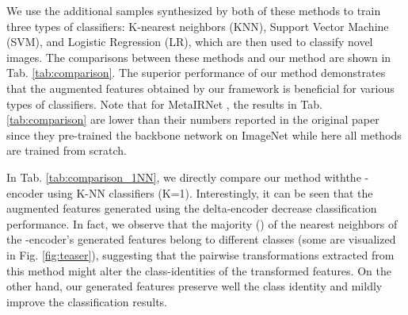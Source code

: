 \documentclass[10pt,twocolumn,letterpaper]{article}
\begin{document}
  
We use the additional samples synthesized by both of these methods to train three types of classifiers:
  K-nearest neighbors (KNN), Support Vector Machine (SVM), and Logistic Regression (LR), which are then used to classify novel images. The comparisons between these methods and our method are shown in Tab. \ref{tab:comparison}.
The superior performance of our method demonstrates that the augmented features obtained by our framework is beneficial for various types of classifiers.
Note that for MetaIRNet \cite{metair_gan}, the results in Tab. \ref{tab:comparison} are lower than their numbers reported in the original paper since they pre-trained the backbone network on ImageNet while here all methods are trained from scratch. 
   \begin{table}[!h] 
    \centering

    \caption{\textbf{Analysis of different classifiers.} Few-shot classification accuracy on the CUB ~\cite{cub} dataset in 1-shot and 5-shot settings with different types of classifiers.
}
    \label{tab:comparison}\end{table}
  
  In Tab. \ref{tab:comparison_1NN}, we directly compare our method withthe  -encoder using K-NN classifiers (K=1). Interestingly, it can be seen that the augmented features generated using the delta-encoder decrease classification performance. In fact, we observe that the majority () of the nearest neighbors of the -encoder's generated features belong to different classes (some are visualized in Fig. \ref{fig:teaser}), suggesting that the pairwise transformations extracted from this method might alter the class-identities of the transformed features. On the other hand, our generated features preserve well the class identity and mildly improve the classification results.
  
\end{document}
